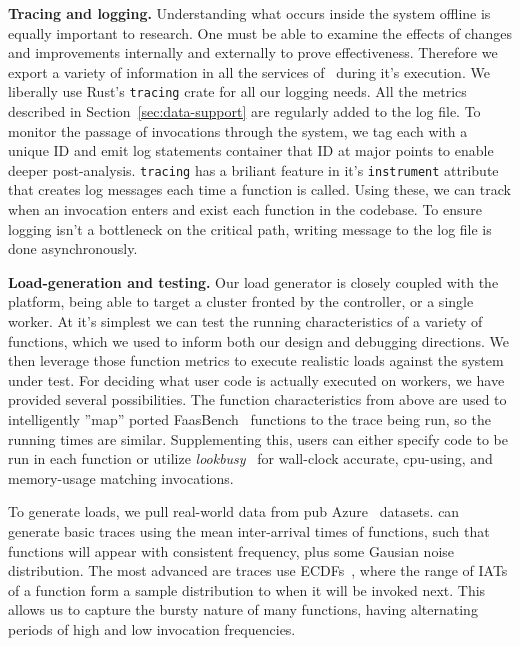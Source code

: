 \textbf{Tracing and logging.}
Understanding what occurs inside the system offline is equally important to research.
One must be able to examine the effects of changes and improvements internally and externally to prove effectiveness.
Therefore we export a variety of information in all the services of \sysname~during it's execution.
We liberally use Rust's \texttt{tracing} crate for all our logging needs.
All the metrics described in Section~\ref{sec:data-support} are regularly added to the log file.
To monitor the passage of invocations through the system, we tag each with a unique ID and emit log statements container that ID at major points to enable deeper post-analysis.
\texttt{tracing} has a briliant feature in it's \texttt{instrument} attribute that creates log messages each time a function is called.
Using these, we can track when an invocation enters and exist each function in the codebase.
To ensure logging isn't a bottleneck on the critical path, writing message to the log file is done asynchronously.


\textbf{Load-generation and testing.}
Our load generator is closely coupled with the platform, being able to target a cluster fronted by the controller, or a single worker.
At it's simplest we can test the running characteristics of a variety of functions, which we used to inform both our design and debugging directions.
We then leverage those function metrics to execute realistic loads against the system under test.
For deciding what user code is actually executed on workers, we have provided several possibilities.
The function characteristics from above are used to intelligently ''map'' ported FaasBench~\cite{} functions to the trace being run, so the running times are similar.
Supplementing this, users can either specify code to be run in each function or utilize \emph{lookbusy}~\cite{} for wall-clock accurate, cpu-using, and memory-usage matching invocations.


To generate loads, we pull real-world data from pub Azure~\cite{} datasets.
\sysname{} can generate basic traces using the mean inter-arrival times of functions, such that functions will appear with consistent frequency, plus some Gausian noise distribution.
The most advanced are traces use ECDFs~\cite{}, where the range of IATs of a function form a sample distribution to when it will be invoked next.
This allows us to capture the bursty nature of many functions, having alternating periods of high and low invocation frequencies.




